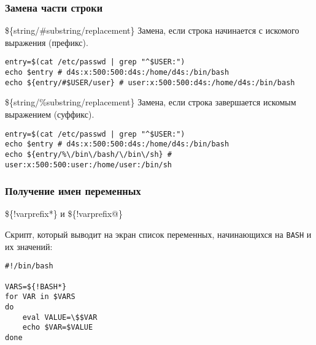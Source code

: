 \begin{frame}[fragile]
	\frametitle{Замена части строки}

	\begin{block}{\$\{string/\#substring/replacement\}}
		Замена, если строка начинается с искомого выражения (префикс).

	\begin{lstlisting}
entry=$(cat /etc/passwd | grep "^$USER:")
echo $entry # d4s:x:500:500:d4s:/home/d4s:/bin/bash
echo ${entry/#$USER/user} # user:x:500:500:d4s:/home/d4s:/bin/bash
	\end{lstlisting}
	\end{block}

	\pause
	\begin{block}{\$\{string/\%substring/replacement\}}
		Замена, если строка завершается искомым выражением (суффикс).

	\begin{lstlisting}
entry=$(cat /etc/passwd | grep "^$USER:")
echo $entry # d4s:x:500:500:d4s:/home/d4s:/bin/bash
echo ${entry/%\/bin\/bash/\/bin\/sh} # user:x:500:500:user:/home/user:/bin/sh
	\end{lstlisting}
	\end{block}

\end{frame}

\begin{frame}[fragile]
	\frametitle{Получение имен переменных}

	\begin{block}{ \$\{!varprefix*\} и \$\{!varprefix@\} }

		Скрипт, который выводит на экран список переменных, начинающихся на {\tt BASH} и их значений:
	\begin{lstlisting}
#!/bin/bash

VARS=${!BASH*}
for VAR in $VARS
do
    eval VALUE=\$$VAR
    echo $VAR=$VALUE
done
	\end{lstlisting}
	\end{block}
\end{frame}

